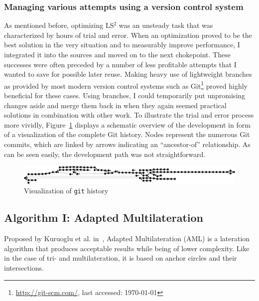 \subsubsection{Managing various attempts using a version control system}
As mentioned before, optimizing LS$^{2}$ was an unsteady task that was characterized by hours of trial and error. When an optimization proved to be the best solution in the very situation and to measurably improve performance, I integrated it into the sources and moved on to the next chokepoint. These successes were often preceded by a number of less profitable attempts that I wanted to save for possible later reuse. Making heavy use of lightweight branches as provided by most modern version control systems such as Git\footnote{\url{http://git-scm.com/}, last accessed: \today{}} proved highly beneficial for these cases. Using branches, I could temporarily put unpromising changes aside and merge them back in when they again seemed practical solutions in combination with other work. To illustrate the trial and error process more vividly, Figure~\ref{fig:branchtree} displays a schematic overview of the development in form of a visualization of the complete Git history. Nodes represent the numerous Git commits, which are linked by arrows indicating an ``ancestor-of'' relationship. As can be seen easily, the development path was not straightforward.

\begin{figure}[h]
\begin{center}
\includegraphics[width=14cm]{img/branchtree}
\end{center}
\caption{Visualization of \texttt{git} history}
\label{fig:branchtree}
\end{figure}

\subsection{Algorithm I: Adapted Multilateration}
Proposed by Kuruoglu et al. in~\cite{kuruoglu2009aml}, Adapted Multilateration (AML) is a lateration algorithm that produces acceptable results while being of lower complexity. Like in the case of tri- and multilateration, it is based on anchor circles and their intersections.

